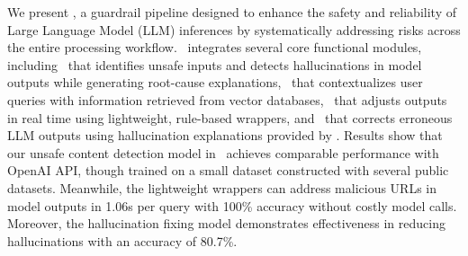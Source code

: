 We present \goodname, a guardrail pipeline designed to enhance the safety and reliability of Large Language Model (LLM) inferences by systematically addressing risks across the entire processing workflow. 
\goodname~integrates several core functional modules, including %
\detection~that identifies unsafe inputs and detects hallucinations in model outputs while generating root-cause explanations,
\grounding~that contextualizes user queries with information retrieved from vector databases, \customization~that adjusts outputs in real time using lightweight, rule-based wrappers, %
and
\fixing~that corrects erroneous LLM outputs using hallucination explanations provided by \detection.
Results show that our unsafe content detection model in \detection~achieves comparable performance with OpenAI API, though trained on a small dataset constructed with several public datasets. 
Meanwhile, the lightweight wrappers can address malicious URLs in model outputs in 1.06s per query with 100\% accuracy without costly model calls. Moreover, the hallucination fixing model demonstrates effectiveness in reducing hallucinations with an accuracy of 80.7\%. 
